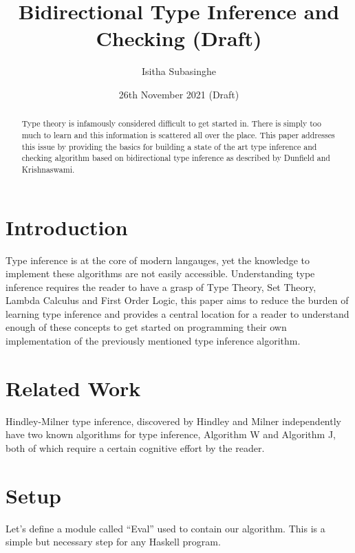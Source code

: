 \documentclass[a4paper,11pt]{article}
\title{\bf Bidirectional Type Inference and Checking (Draft)}
\author{Isitha Subasinghe}
\date{26th November 2021 (Draft)}
\begin{document}
\maketitle

\begin{abstract}\noindent
Type theory is infamously considered difficult to get started in. 
There is simply too much to learn and this information is scattered all over the place. 
This paper addresses this issue by providing the basics for building a state of the art type inference and checking 
algorithm based on bidirectional type inference as described by Dunfield and Krishnaswami.
\end{abstract}

\section{Introduction}
Type inference is at the core of modern langauges, yet the knowledge to implement these algorithms are 
not easily accessible. Understanding type inference requires the reader to have a grasp of Type Theory, Set Theory, Lambda Calculus and 
First Order Logic, this paper aims to reduce the burden of learning type inference and provides a central location for a reader to understand enough of these concepts 
to get started on programming their own implementation of the previously mentioned type inference algorithm. 

\section{Related Work}
Hindley-Milner type inference, discovered by Hindley and Milner independently have two known algorithms for type inference, Algorithm W and Algorithm J, both of which require 
a certain cognitive effort by the reader.

\section{Setup}
Let's define a module called ``Eval'' used to contain our algorithm. This is a simple but necessary step for any Haskell program. 
\end{document}
